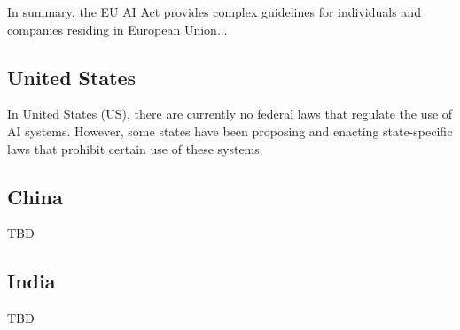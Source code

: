 In summary, the EU AI Act provides complex guidelines for individuals and companies residing in European Union...


\subsection{United States}
In United States (US), there are currently no federal laws that regulate the use of AI systems. However, some states have been proposing and enacting state-specific laws that prohibit certain use of these systems. 

\subsection{China}
TBD 

\subsection{India}
TBD 

